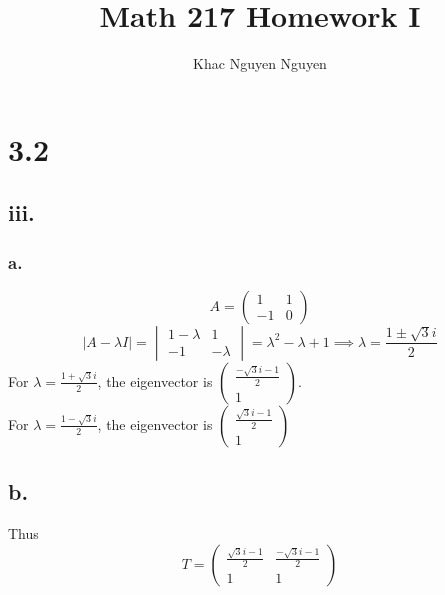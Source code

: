 \documentclass[11pt]{article}
\title{\textbf{Math 217 Homework I}}
\author{Khac Nguyen Nguyen}
\date{}
\theoremstyle{mystyle}
\theoremstyle{definition}
\begin{document}
\section*{3.2}
\subsection*{iii.}
\subsubsection*{a.}
\[
  A = 
  \begin{pmatrix}
    1 & 1 \\
    -1 & 0
  \end{pmatrix}
\]
\[
  |A-\lambda I |= 
  \begin{vmatrix}
    1 - \lambda & 1 \\
    -1 & -\lambda
  \end{vmatrix}
  = \lambda^2 - \lambda + 1 
  \implies \lambda = \displaystyle\frac{1 \pm \sqrt{3}i}{2}
\]
For $\lambda = \displaystyle\frac{1 + \sqrt{3}i}{2}$, the eigenvector is 
$\begin{pmatrix}
  \displaystyle\frac{-\sqrt{3}i-1}{2} \\
  1
\end{pmatrix}
$. \\
For $\lambda = \displaystyle\frac{1 - \sqrt{3}i}{2}$, the eigenvector is 
$\begin{pmatrix}
  \displaystyle\frac{\sqrt{3}i-1}{2} \\
  1
\end{pmatrix}
$
\subsection*{b.}
Thus 
\[
  T = 
  \begin{pmatrix}
    \frac{\sqrt{3}i - 1}{2} & \frac{-\sqrt{3}i -1}{2} \\
    1 & 1
  \end{pmatrix}
\]
\end{document}
